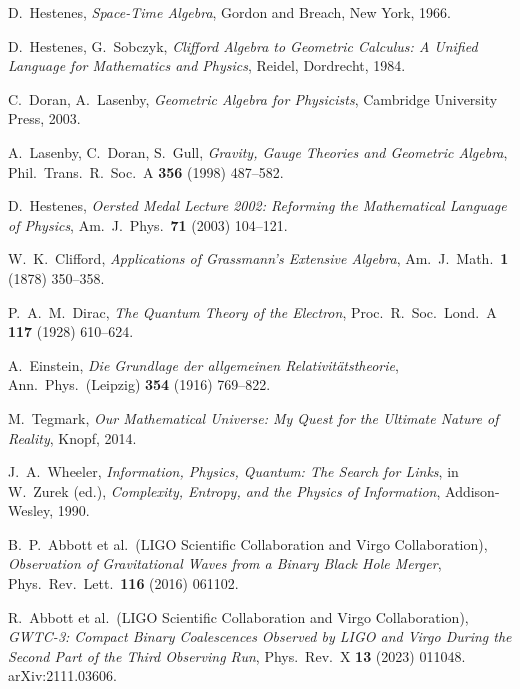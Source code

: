 \documentclass[11pt,a4paper]{article}
\theoremstyle{definition}
\theoremstyle{plain}
\theoremstyle{remark}
\begin{document}
\vspace{1em}

\begin{thebibliography}{99}\setlength{\itemsep}{3pt}

D.~Hestenes, \emph{Space-Time Algebra}, Gordon and Breach, New York, 1966.

D.~Hestenes, G.~Sobczyk, \emph{Clifford Algebra to Geometric Calculus: A Unified Language for Mathematics and Physics}, Reidel, Dordrecht, 1984.

C.~Doran, A.~Lasenby, \emph{Geometric Algebra for Physicists}, Cambridge University Press, 2003.

A.~Lasenby, C.~Doran, S.~Gull, \emph{Gravity, Gauge Theories and Geometric Algebra}, Phil.\ Trans.\ R.\ Soc.\ A \textbf{356} (1998) 487--582.

D.~Hestenes, \emph{Oersted Medal Lecture 2002: Reforming the Mathematical Language of Physics}, Am.\ J.\ Phys.\ \textbf{71} (2003) 104--121.

W.~K.~Clifford, \emph{Applications of Grassmann's Extensive Algebra}, Am.\ J.\ Math.\ \textbf{1} (1878) 350--358.

P.~A.~M.~Dirac, \emph{The Quantum Theory of the Electron}, Proc.\ R.\ Soc.\ Lond.\ A \textbf{117} (1928) 610--624.

A.~Einstein, \emph{Die Grundlage der allgemeinen Relativitätstheorie}, Ann.\ Phys.\ (Leipzig) \textbf{354} (1916) 769--822.

M.~Tegmark, \emph{Our Mathematical Universe: My Quest for the Ultimate Nature of Reality}, Knopf, 2014.

J.~A.~Wheeler, \emph{Information, Physics, Quantum: The Search for Links}, in W.~Zurek (ed.), \textit{Complexity, Entropy, and the Physics of Information}, Addison-Wesley, 1990.

B.~P.~Abbott et al.\ (LIGO Scientific Collaboration and Virgo Collaboration), \emph{Observation of Gravitational Waves from a Binary Black Hole Merger}, Phys.\ Rev.\ Lett.\ \textbf{116} (2016) 061102.

R.~Abbott et al.\ (LIGO Scientific Collaboration and Virgo Collaboration), \emph{GWTC-3: Compact Binary Coalescences Observed by LIGO and Virgo During the Second Part of the Third Observing Run}, Phys.\ Rev.\ X \textbf{13} (2023) 011048. arXiv:2111.03606.


\end{thebibliography}
\end{document}
